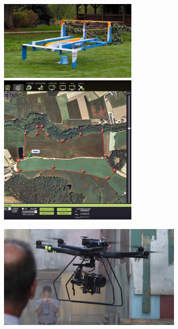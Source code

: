 \documentclass[notes,slidesec,a4]{seminar}
\begin{document}
\begin{hslide}
\begin{minipage}[t]{0.5\textwidth}
\begin{center}
\begin{figure}
\includegraphics[width=0.6\textwidth]{img/amazon}
\includegraphics[width=0.6\textwidth]{img/hemav1}
\end{figure}
\end{center}
\end{minipage}
\begin{minipage}[t]{0.5\textwidth}
\begin{center}
\begin{figure}
\includegraphics[width=0.8\textwidth]{img/dronefilm}

\end{figure}
\end{center}
\end{minipage}
\end{hslide}
\end{document}
